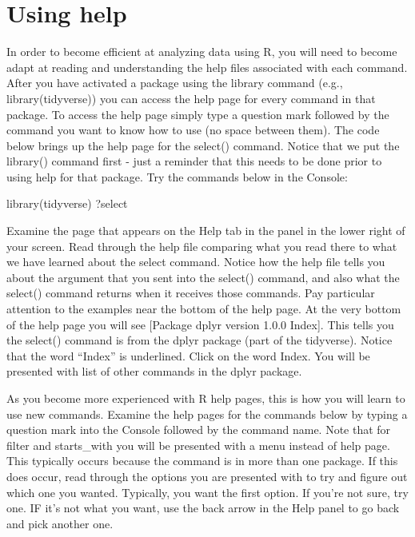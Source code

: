 \documentclass[
]{krantz}
\makeatletter
\newenvironment{Shaded}{\begin{snugshade}}{\end{snugshade}}
\newcommand{\FunctionTok}[1]{\textcolor[rgb]{0,0,0}{#1}}
\newcommand{\NormalTok}[1]{#1}
\newenvironment{kframe}{%
\medskip{}
\setlength{\fboxsep}{.8em}
 \def\at@end@of@kframe{}%
 \ifinner\ifhmode%
  \def\at@end@of@kframe{\end{minipage}}%
  \begin{minipage}{\columnwidth}%
 \fi\fi%
 \def\FrameCommand##1{\hskip\@totalleftmargin \hskip-\fboxsep
 \colorbox{shadecolor}{##1}\hskip-\fboxsep
     \hskip-\linewidth \hskip-\@totalleftmargin \hskip\columnwidth}%
 \MakeFramed {\advance\hsize-\width
   \@totalleftmargin\z@ \linewidth\hsize
   \@setminipage}}%
 {\par\unskip\endMakeFramed%
 \at@end@of@kframe}
\renewenvironment{Shaded}{\begin{kframe}}{\end{kframe}}
\makeatother
\begin{document}
\hypertarget{using-help}{%
\section{Using help}\label{using-help}}

In order to become efficient at analyzing data using R, you will need to become adapt at reading and understanding the help files associated with each command. After you have activated a package using the library command (e.g., library(tidyverse)) you can access the help page for every command in that package. To access the help page simply type a question mark followed by the command you want to know how to use (no space between them). The code below brings up the help page for the select() command. Notice that we put the library() command first - just a reminder that this needs to be done prior to using help for that package. Try the commands below in the Console:

\begin{Shaded}
\begin{Highlighting}[]
\FunctionTok{library}\NormalTok{(tidyverse)}
\NormalTok{?select}
\end{Highlighting}
\end{Shaded}

Examine the page that appears on the Help tab in the panel in the lower right of your screen. Read through the help file comparing what you read there to what we have learned about the select command. Notice how the help file tells you about the argument that you sent into the select() command, and also what the select() command returns when it receives those commands. Pay particular attention to the examples near the bottom of the help page. At the very bottom of the help page you will see {[}Package dplyr version 1.0.0 Index{]}. This tells you the select() command is from the dplyr package (part of the tidyverse). Notice that the word ``Index'' is underlined. Click on the word Index. You will be presented with list of other commands in the dplyr package.

As you become more experienced with R help pages, this is how you will learn to use new commands. Examine the help pages for the commands below by typing a question mark into the Console followed by the command name. Note that for filter and starts\_with you will be presented with a menu instead of help page. This typically occurs because the command is in more than one package. If this does occur, read through the options you are presented with to try and figure out which one you wanted. Typically, you want the first option. If you're not sure, try one. IF it's not what you want, use the back arrow in the Help panel to go back and pick another one.
\end{document}
